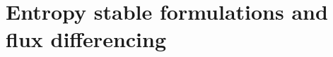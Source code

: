 \documentclass[compress]{beamer}
\theoremstyle{plain}
\newcommand{\pd}[2]{\frac{\partial #1}{\partial #2}}
\newcommand{\LRp}[1]{\left( #1 \right)}
\newcommand{\LRs}[1]{\left[ #1 \right]}
\begin{document}

\section{Entropy stable formulations and flux differencing}
\end{document}
